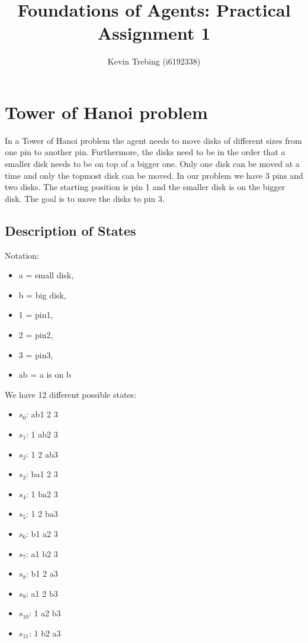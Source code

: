 \documentclass[a4paper]{article}
\title{Foundations of Agents: Practical Assignment 1}
\author{Kevin Trebing (i6192338)}
\begin{document}
\maketitle

\section{Tower of Hanoi problem}
In a Tower of Hanoi problem the agent needs to move disks of different sizes from one pin to another pin. Furthermore, the disks need to be in the order that a smaller disk needs to be on top of a bigger one. Only one disk can be moved at a time and only the topmost disk can be moved. In our problem we have 3 pins and two disks. The starting position is pin 1 and the smaller disk is on the bigger disk. The goal is to move the disks to pin 3.

\subsection{Description of States}
Notation:
\begin{multicols}{2}
\begin{itemize}

\item a = small disk,
\item b = big disk,
\item 1 = pin1,
\item 2 = pin2,
\item 3 = pin3,
\item ab = a is on b
\end{itemize}
\end{multicols}

\noindent
We have 12 different possible states:
\begin{multicols}{2}
\begin{itemize}
\item $s_{0}$: ab1 2 3
\item $s_{1}$: 1 ab2 3
\item $s_{2}$: 1 2 ab3
\item $s_{3}$: ba1 2 3
\item $s_{4}$: 1 ba2 3
\item $s_{5}$: 1 2 ba3
\item $s_{6}$: b1 a2 3
\item $s_{7}$: a1 b2 3
\item $s_{8}$: b1 2 a3
\item $s_{9}$: a1 2 b3
\item $s_{10}$: 1 a2 b3
\item $s_{11}$: 1 b2 a3
\end{itemize}
\end{multicols}
\end{document}
